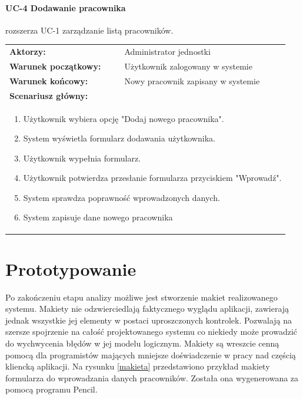 \paragraph{UC-4 Dodawanie pracownika}
rozszerza UC-1 zarządzanie listą pracowników.\\
\begin{tabular}{ll}
	\textbf{Aktorzy:} & Administrator jednostki \\
	
	\textbf{Warunek początkowy:} & Użytkownik zalogowany w systemie \\
	\textbf{Warunek końcowy:} & Nowy pracownik zapisany w systemie \\
	\multicolumn{2}{l}{\textbf{Scenariusz główny:}}\\
	\multicolumn{2}{l}{
	\begin{minipage}{\textwidth}\begin{enumerate}
		\item Użytkownik wybiera opcję "Dodaj nowego pracownika".
		\item System wyświetla formularz dodawania użytkownika.
		\item Użytkownik wypełnia formularz.
		\item Użytkownik potwierdza przesłanie formularza przyciskiem "Wprowadź".
		\item System sprawdza poprawność wprowadzonych danych.
		\item System zapisuje dane nowego pracownika
	\end{enumerate}\end{minipage}
	}
\end{tabular}
	
\section[Prototypowanie][Prototypowanie]{Prototypowanie}
Po zakończeniu etapu analizy możliwe jest stworzenie makiet realizowanego systemu. Makiety nie odzwierciedlają faktycznego wyglądu aplikacji, zawierają jednak wszystkie jej elementy w postaci uproszczonych kontrolek. Pozwalają na szersze spojrzenie na całość projektowanego systemu co niekiedy może prowadzić do wychwycenia błędów w jej modelu logicznym. Makiety są wreszcie cenną pomocą dla programistów mających mniejsze doświadczenie w pracy nad częścią kliencką aplikacji. Na rysunku \ref{makieta} przedstawiono przykład makiety formularza do wprowadzania danych pracowników. Została ona wygenerowana za pomocą programu Pencil.

